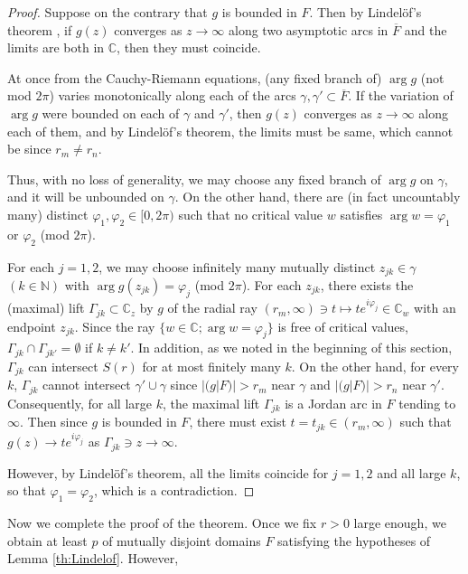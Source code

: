\documentclass[a4paper,12pt]{amsart}
\theoremstyle{plain}
\theoremstyle{definition}
\theoremstyle{remark}
\numberwithin{equation}{section}
\begin{document}
\begin{proof}
Suppose on the contrary that $g$ is bounded in $F$.
Then by Lindel\"of's theorem \cite[p.\ 75]{Nevan70},
if $g(z)$ converges as $z\to\infty$
along two asymptotic arcs in $\overline{F}$ and 
the limits are both in ${\mathbb{C}}$, then they must coincide.

At once from the Cauchy-Riemann equations,
(any fixed branch of) $\arg g$ (not mod $2\pi$) varies monotonically
along each of the arcs $\gamma,\gamma'\subset\overline{F}$.
If the variation of $\arg g$ were bounded on each of $\gamma$ and $\gamma'$,
then $g(z)$ converges as $z\to\infty$ along each of them,
and by Lindel\"of's theorem, the limits must be same, 
which cannot be since $r_m\neq r_n$.

Thus, with no loss of generality, we may choose any fixed branch
of $\arg g$ on $\gamma$, and it will be unbounded on $\gamma$.
On the other hand, there are (in fact uncountably many)
distinct $\varphi_1,\varphi_2\in [0, 2\pi)$ such that
no critical value $w$ satisfies $\arg w=\varphi_1$ or $\varphi_2$ (mod $2\pi$).

For each $j=1,2$, we may choose infinitely many mutually distinct 
$z_{jk}\in\gamma$ $(k\in{\mathbb{N}})$ with $\arg g(z_{jk})=\varphi_j$ (mod $2\pi$).
For each $z_{jk}$, there exists the (maximal) lift $\Gamma_{jk}\subset{\mathbb{C}}_z$ by $g$
of the radial ray $(r_m,\infty)\ni t\mapsto te^{i\varphi_j}\in{\mathbb{C}}_w$
with an endpoint $z_{jk}$. 
Since the ray $\{w\in{\mathbb{C}};\arg w=\varphi_j\}$ is free of critical values, 
$\Gamma_{jk}\cap \Gamma_{jk'}=\emptyset$ if $k\neq k'$. 
In addition, as we noted in the beginning of this section,
$\Gamma_{jk}$ can intersect $S(r)$ for at most finitely many $k$.
On the other hand, for every $k$, $\Gamma_{jk}$ cannot intersect 
$\gamma'\cup\gamma$ since $|(g|F)|>r_m$ near $\gamma$ and $|(g|F)|>r_n$ near $\gamma'$.
Consequently, for all large $k$, the maximal lift $\Gamma_{jk}$
is a Jordan arc in $F$ tending to $\infty$. Then
since $g$ is bounded in $F$, there must exist $t=t_{jk}\in(r_m,\infty)$ such that
$g(z)\to te^{i\varphi_j}$ as $\Gamma_{jk}\ni z\to\infty$.

However, by Lindel\"of's theorem,
all the limits coincide for $j=1,2$ and all large $k$,
so that $\varphi_1=\varphi_2$, which is a contradiction.
\end{proof}

Now we complete the proof of the theorem.
Once we fix $r>0$ large enough,
we obtain at least $p$ of mutually disjoint domains $F$
satisfying the hypotheses of Lemma \ref{th:Lindelof}.
However,
\end{document}
